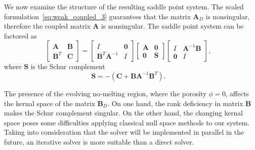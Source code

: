 
We now examine the structure of the resulting saddle point system.
The scaled formulation~\eqref{eq:weak_coupled_3} guarantees that the 
matrix $\mathbf{A}_D$ is nonsingular, therefore the coupled matrix $\mathbf{A}$ is 
nonsingular. The saddle point system can be factored as
\begin{equation}\label{eq:blockfactor}
		  \begin{bmatrix}
					 \mathbf{A} &\mathbf{B} \\
					 \mathbf{B}^T &\mathbf{C}
		  \end{bmatrix} = \begin{bmatrix}
					 I &\mathbf{0}\\
					 \mathbf{B}^T\mathbf{A}^{-1} &I
		  \end{bmatrix}\begin{bmatrix}
					 \mathbf{A}  &\mathbf{0}\\
					 \mathbf{0} &\mathbf{S}
		  \end{bmatrix} \begin{bmatrix}
					 I &\mathbf{A}^{-1} \mathbf{B} \\
					 \mathbf{0} &I
		  \end{bmatrix},
\end{equation}
where $\mathbf{S}$ is the Schur complement
\begin{equation}\label{eq:schurcomplement}
		  \mathbf{S} = -(\mathbf{C} + \mathbf{BA}^{-1}\mathbf{B}^T).
\end{equation}

The presence of the evolving no-melting region, where the porosity $\phi=0$, 
affects the kernal space of the matrix $\mathbf{B}_D$.
On one hand, the rank deficiency in matrix $\mathbf{B}$ makes the Schur complement
singular. On the other hand, the changing kernal space poses some difficulties
applying classical null space methods to our system.
Taking into consideration that the solver will be implemented in parallel in the future, 
an iterative solver is more suitable than a direct solver.

